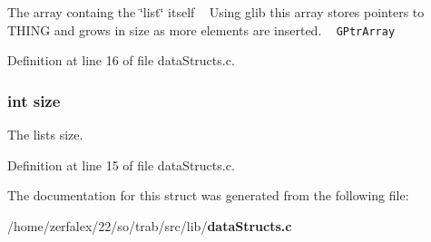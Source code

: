 The array containg the \char`\"{}list\char`\"{} itself  ~\newline
 Using glib this array stores pointers to T\+H\+I\+NG and grows in size as more elements are inserted. ~\newline
 {\tt G\+Ptr\+Array  } 



Definition at line 16 of file data\+Structs.\+c.

\subsubsection[{size}]{\setlength{\rightskip}{0pt plus 5cm}int size}\label{structlist_a439227feff9d7f55384e8780cfc2eb82}


The list\textquotesingle{}s size. 



Definition at line 15 of file data\+Structs.\+c.



The documentation for this struct was generated from the following file\+:\begin{DoxyCompactItemize}
\item 
/home/zerfalex/22/so/trab/src/lib/{\bf data\+Structs.\+c}\end{DoxyCompactItemize}
